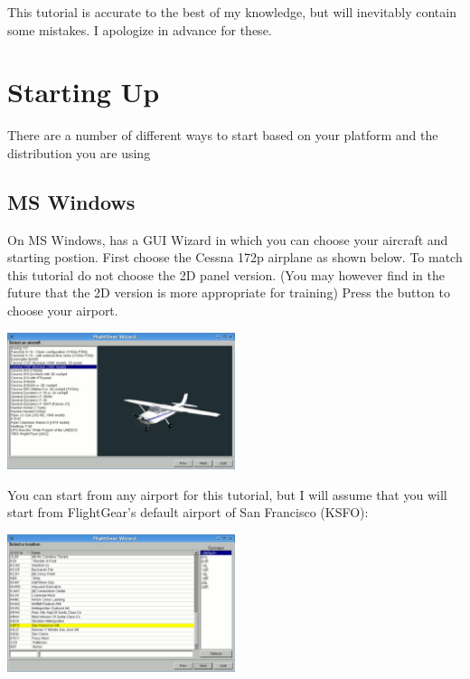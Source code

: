 This tutorial is accurate to the best of my knowledge, but will inevitably
contain some mistakes. I apologize in advance for these.

\section{Starting Up}

There are a number of different ways to start \FlightGear{} based on your
platform and the distribution you are using

\subsection{MS Windows}
    
On MS Windows, \FlightGear{} has a GUI Wizard in which you can choose your
aircraft and starting postion. First choose the Cessna 172p airplane as shown 
below. To match this tutorial do not choose the 2D panel version. 
(You may however find in the future that the 2D version is more appropriate 
for training) Press the  button to choose your airport.

\begin{center}
\includegraphics[width=0.5\textwidth]{img/tut_2}
\end{center}
    
You can start from any airport for this tutorial, but I will assume that you 
will start from FlightGear's default airport of San Francisco (KSFO):

\begin{center}
\includegraphics[width=0.5\textwidth]{img/tut_3}
\end{center}

